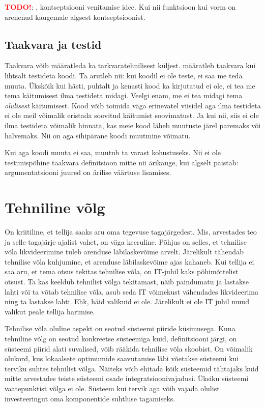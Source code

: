 \documentclass{tufte-book}
\newcommand{\TODO}{\textcolor{red}{\bf TODO!}\xspace}
\begin{document}
\TODO:  \cite{nlp}, kontseptsiooni venitamise idee. Kui nii funktsioon kui vorm on arenenud kaugemale algsest kontseptsioonist.

\subsection{Taakvara ja testid}
Taakvara võib määratleda ka tarkvaratehnilisest küljest. \citeauthor{feathers2004working} määratleb taakvara kui lihtsalt testideta koodi. \cite{feathers2004working} Ta arutleb nii: kui koodil ei ole teste, ei saa me teda muuta. Ükskõik kui hästi, puhtalt ja kenasti kood ka kirjutatud ei ole, ei tea me tema käitumisest ilma testideta midagi. Veelgi enam, me ei tea midagi tema \emph{olulisest} käitumisest. Kood võib toimida väga erinevatel viisidel aga ilma testideta ei ole meil võimalik eristada soovitud käitumist soovimatust. Ja kui nii, siis ei ole ilma testideta võimalik hinnata, kas meie kood läheb muutuste järel paremaks või halvemaks. Nii on aga sihipärane koodi muutmine võimatu.

Kui aga koodi muuta ei saa, muutub ta varast kohustuseks. Nii ei ole testimispõhine taakvara definitsioon mitte nii ärikauge, kui algselt paistab: argumentatsiooni juured on ärilise väärtuse lisamises.

\section{Tehniline võlg}
On kriitiline, et tellija saaks aru oma tegevuse tagajärgedest. Mis, arvestades teo ja selle tagajärje ajalist vahet, on väga keeruline. Põhjus on selles, et tehnilise võla likvideerimine tuleb arenduse läbilaskevõime arvelt. Järelikult tähendab tehnilise võla kuhjumine, et arenduse läbilaskevõime ajas kahaneb. Kui tellija ei saa aru, et tema otsus tekitas tehnilise võla, on IT-juhil kaks põhimõttelist otsust. Ta kas keeldub tehnilist võlga tekitamast, näib paindumatu ja lastakse lahti või ta võtab tehnilise võla, asub seda IT võimekust vähendades likvideerima ning ta lastakse lahti. Ehk, häid valikuid ei ole. Järelikult ei ole IT juhil muud valikut peale tellija harimise.

Tehnilise võla oluline aspekt on seotud süsteemi piiride küsimusega. Kuna tehniline võlg on seotud konkreetse süsteemiga kuid, definitsiooni järgi, on süsteemi piirid alati suvalised, võib rääkida tehnilise võla skoobist. On võimalik olukord, kus lokaalsete optimumide saavutamise läbi võetakse süsteemi kui terviku suhtes tehnilist võlga. Näiteks võib ehitada kõik süsteemid tähtajaks kuid mitte arvestades teiste süsteemi osade integratsioonivajadusi. Üksiku süsteemi vaatepunktist võlga ei ole. Süsteem kui tervik aga võib vajada olulist investeeringut oma komponentide suhtluse tagamiseks. 
\end{document}

